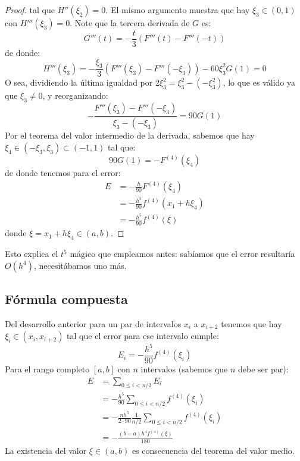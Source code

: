\begin{proof}
    tal que \(H''(\xi_2) = 0\).
    El mismo argumento muestra que hay \(\xi_3 \in (0, 1)\)
    con \(H'''(\xi_3) = 0\).
    Note que la tercera derivada de \(G\) es:
    \begin{equation*}
      G'''(t)
        = -  \frac{t}{3} (F'''(t) - F'''(-t))
    \end{equation*}
    de donde:
    \begin{equation*}
      H'''(\xi_3)
        = - \frac{\xi_3}{3} (F'''(\xi_3) - F'''(- \xi_3)) - 60 \xi_3^2 G(1)
        = 0
    \end{equation*}
    O sea,
    dividiendo la última igualdad por \(2 \xi_3^2 = \xi_3^2 - (-\xi_3^2)\),
    lo que es válido ya que \(\xi_3 \ne 0\),
    y reorganizando:
    \begin{equation*}
      - \frac{F'''(\xi_3) - F'''(-\xi_3)}{\xi_3 - (-\xi_3)}
        = 90 G(1)
    \end{equation*}
    Por el teorema del valor intermedio de la derivada,
    sabemos que hay \(\xi_4 \in (-\xi_3, \xi_3) \subset (-1, 1)\)
    tal que:
    \begin{equation*}
      90 G(1)
        = - F^{(4)}(\xi_4)
    \end{equation*}
    de donde tenemos para el error:
    \begin{align*}
      E
        &= - \frac{h}{90} F^{(4)}(\xi_4) \\
        &= - \frac{h^5}{90} f^{(4)}(x_1 + h \xi_4) \\
        &= - \frac{h^5}{90} f^{(4)}(\xi)
    \end{align*}
    donde \(\xi = x_1 + h \xi_4 \in (a, b)\).
  \end{proof}
  Esto explica el \(t^5\) mágico que empleamos antes:
  sabíamos que el error resultaría \(O(h^4)\),
  necesitábamos uno más.

\subsection{Fórmula compuesta}
\label{sec:composite-Simpson}

  Del desarrollo anterior para un par de intervalos \(x_i\) a \(x_{i + 2}\)
  tenemos que hay \(\xi_i \in (x_i, x_{i + 2})\)
  tal que el error para ese intervalo cumple:
  \begin{equation*}
    E_i
      = - \frac{h^5}{90} f^{(4)}(\xi_i)
  \end{equation*}
  Para el rango completo \([a, b]\) con \(n\) intervalos
  (sabemos que \(n\) debe ser par):
  \begin{align*}
    E
      &= \sum_{0 \le i < n / 2} E_i \\
      &= - \frac{h^5}{90} \sum_{0 \le i < n / 2} f^{(4)}(\xi_i) \\
      &= - \frac{n h^5}{2 \cdot 90}
             \frac{1}{n / 2} \sum_{0 \le i < n / 2} f^{(4)}(\xi_i) \\
      &= - \frac{(b - a) h^4 f^{(4)}(\xi)}{180}
  \end{align*}
  La existencia del valor \(\xi \in (a, b)\)
  es consecuencia del teorema del valor medio.


